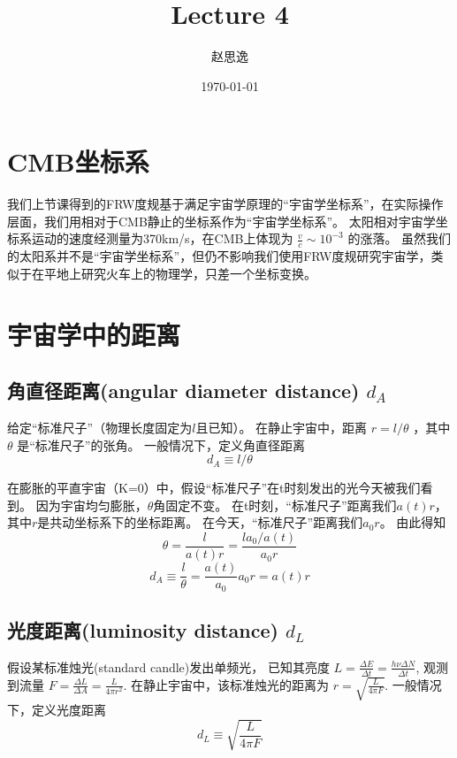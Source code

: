 \documentclass[12pt]{ctexart}
\title{Lecture 4}
\author{赵思逸}
\date{\today}
\begin{document}
\maketitle

\section*{CMB坐标系}

我们上节课得到的FRW度规基于满足宇宙学原理的“宇宙学坐标系”，在实际操作层面，我们用相对于CMB静止的坐标系作为“宇宙学坐标系”。  
太阳相对宇宙学坐标系运动的速度经测量为370km/s，在CMB上体现为 $\frac{v}{c} \sim 10^{-3}$ 的涨落。
虽然我们的太阳系并不是“宇宙学坐标系”，但仍不影响我们使用FRW度规研究宇宙学，类似于在平地上研究火车上的物理学，只差一个坐标变换。

\section{宇宙学中的距离}

\subsection{角直径距离(angular diameter distance) $d_A$ }

给定“标准尺子”（物理长度固定为$l$且已知）。
在静止宇宙中，距离 $r = l/\theta$ ，其中 $\theta$ 是“标准尺子”的张角。
一般情况下，定义角直径距离
\begin{equation}
    d_A \equiv l/\theta
\end{equation}

在膨胀的平直宇宙（K=0）中，假设“标准尺子”在t时刻发出的光今天被我们看到。
因为宇宙均匀膨胀，$\theta$角固定不变。
在t时刻，“标准尺子”距离我们$a(t)r$，其中$r$是共动坐标系下的坐标距离。
在今天，“标准尺子”距离我们$a_0 r$。
由此得知
\begin{equation}
    \theta = \frac{l}{a(t)r} = \frac{l a_0/a(t)}{a_0 r}
\end{equation}
\begin{equation}
    d_A \equiv \frac{l}{\theta} = \frac{a(t)}{a_0} a_0 r = a(t) r
\end{equation}

\subsection{光度距离(luminosity distance) $d_L$ }

假设某标准烛光(standard candle)发出单频光，
已知其亮度 $L=\frac{\Delta E}{\Delta t} = \frac{h\nu \Delta N}{\Delta t}$,
观测到流量 $F=\frac{\Delta L}{\Delta A} = \frac{L}{4\pi r^2}$.
在静止宇宙中，该标准烛光的距离为 $r=\sqrt{\frac{L}{4\pi F}}$.
一般情况下，定义光度距离
\begin{equation}
    d_L \equiv \sqrt{\frac{L}{4\pi F}}
\end{equation}
\end{document}

